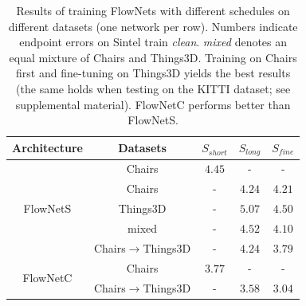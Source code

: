 \documentclass[10pt,twocolumn,letterpaper]{article}%
\newcommand{\chairs}{\mbox{Chairs}\xspace}
\newcommand{\things}{\mbox{Things3D}\xspace}
\newcommand{\Sshort}{S_\mathit{short}}
\newcommand{\Slong}{S_\mathit{long}}
\newcommand{\Sfine}{S_\mathit{fine}}
\begin{document}
\newcommand{\chairsToThings}{\mbox{\chairs$\!\to$\things}\xspace}%

\begin{table}[t]
  \begin{center}
  {\small
  \setlength{\tabcolsep}{0.1cm}
  \begin{tabular}{|c|c||c||cc|} %
  \hline
  Architecture                       & Datasets               & $\Sshort$ & $\Slong$ & $\Sfine$ \\
  
  \hline
  \hline 
  
  \multirow{5}{*}{FlowNetS}   & \chairs                & $4.45$      & -          &  -         \\
                              & \chairs                 & -           & $4.24$     &  $4.21$    \\
                              & \things                & -           & $5.07$     &  $4.50$    \\
                              & mixed                  & -           & $4.52$     &  $4.10$    \\
                              & \chairsToThings    & -           & $4.24$     &  $\mathbf{3.79}$    \\
                              
  \hline \hline
  
  \multirow{2}{*}{FlowNetC}   & \chairs                & $3.77$      & -          &  -         \\
                              & \chairsToThings    & -           & $3.58$     & \cellcolor{gray!15}$\mathbf{3.04}$    \\   
  \hline
  \end{tabular}
  }
  \end{center}
  \caption{
  Results of training FlowNets with different schedules on different datasets (one network per row). Numbers indicate endpoint errors on Sintel train \textit{clean}. \emph{mixed} denotes an equal mixture of \chairs and \things. Training on \chairs first and fine-tuning on \things yields the best results (the same holds when testing on the KITTI dataset; see supplemental material). FlowNetC performs better than FlowNetS. 
  \label{tab:schedules-and-datasets}
  }
\end{table}
\end{document}
